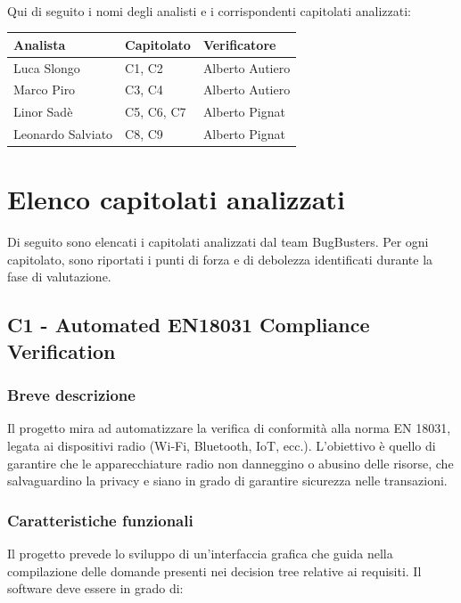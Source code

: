 \documentclass[a4paper,11pt]{article}
\begin{document}
\paragraph{}
Qui di seguito i nomi degli analisti e i corrispondenti capitolati analizzati:

\begin{tabularx}{\textwidth}{|X|X|X|}
\hline
\rowcolor{lightgray!40}
\textbf{Analista} & \textbf{Capitolato} & \textbf{Verificatore} \\
\hline
Luca Slongo & C1, C2 & Alberto Autiero\\ 
\hline
Marco Piro & C3, C4 & Alberto Autiero \\ 
\hline
Linor Sadè & C5, C6, C7 & Alberto Pignat\\ 
\hline
Leonardo Salviato & C8, C9 & Alberto Pignat\\ 
\hline
\end{tabularx}

\newpage
\section{Elenco capitolati analizzati}
\label{sec:elenco_capitolati}
Di seguito sono elencati i capitolati analizzati dal team BugBusters. Per ogni capitolato, sono riportati i punti di forza e di debolezza identificati durante la fase di valutazione.

\newpage
\subsection{C1 - Automated EN18031 Compliance Verification}
\subsubsection{Breve descrizione}
Il progetto mira ad automatizzare la verifica di conformità alla norma EN 18031, legata ai dispositivi radio (Wi-Fi, Bluetooth, IoT, ecc.). L'obiettivo è quello di garantire che le apparecchiature radio non danneggino o abusino delle risorse, che salvaguardino la privacy e siano in grado di garantire sicurezza nelle transazioni.
\subsubsection{Caratteristiche funzionali}
Il progetto prevede lo sviluppo di un'interfaccia grafica che guida nella compilazione delle domande presenti nei decision tree relative ai requisiti. 
Il software deve essere in grado di:
\end{document}
